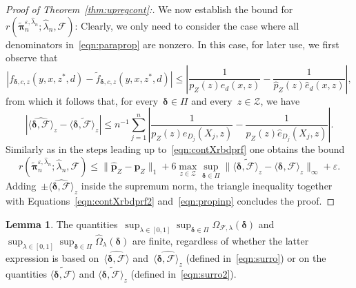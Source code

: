 \documentclass[11pt, a4paper]{article}
\theoremstyle{definition}
\newtheorem{lemma}[theorem]{Lemma}
\begin{document}
\begin{proof}[Proof of Theorem~\ref{thm:upregcont}:]
We now establish the bound for~$r(\tilde{\bm{\pi}}^{\varepsilon,   \hat{\lambda}_n}_n;   \hat{\lambda}_n, \mathcal{F})$: Clearly, we only need to consider the case where all denominators in~\eqref{eqn:paraprop} are nonzero. In this case, for later use, we first observe that
%
\begin{equation}
|f_{\bm{\delta}, c, z}(y, x, z^*, d) - \tilde{f}_{\bm{\delta}, c, z}(y, x, z^*, d)| \leq  \left|  \frac{1}{p_Z(z)e_d(x, z)} - \frac{1}{\hat{p}_Z(z)\hat{e}_d(x, z)} \right|,
\end{equation}
%
from which it follows that, for every~$\bm{\delta} \in \Pi$ and every~$z \in \mathcal{Z}$, we have 
\begin{equation}\label{eqn:propinp}
\left | \widehat{\langle \bm{\delta}, \mathcal{F} \rangle}_z - \widetilde{\langle \bm{\delta}, \mathcal{F} \rangle_z} \right | \leq n^{-1} \sum_{j = 1}^n \left|  \frac{1}{p_Z(z) e_{D_j}(X_j, z)} - \frac{1}{\hat{p}_Z(z)\hat{e}_{D_j}(X_j, z)} \right|.
\end{equation} 
%
Similarly as in the steps leading up to~\eqref{eqn:contXrbdprf} one obtains the bound
$$
r(\tilde{\bm{\pi}}^{\varepsilon,   \hat{\lambda}_n}_n; \hat{\lambda}_n, \mathcal{F}) \leq \|\hat{\bm{p}}_Z - \bm{p}_Z\|_1 + 
6 \max_{z \in \mathcal{Z}} \sup_{\bm{\delta} \in \Pi} \|\widetilde{\langle \bm{\delta}, \mathcal{F} \rangle_z} - \langle \bm{\delta}, \mathcal{F} \rangle_z \|_\infty + \varepsilon.
$$
Adding~$\pm \widehat{\langle \bm{\delta}, \mathcal{F} \rangle}_z$ inside the supremum norm, the triangle inequality together with Equations~\eqref{eqn:contXrbdprf2} and~\eqref{eqn:propinp} concludes the proof. 
\end{proof}


\begin{lemma}\label{lem:bdf}
The quantities~$\sup_{\lambda \in [0, 1]} \sup_{\bm{\delta} \in \Pi} \Omega_{\mathcal{F}, \lambda}(\bm{\delta})$ and $\sup_{\lambda \in [0, 1]} \sup_{\bm{\delta} \in \Pi} \hat{\Omega}_{\lambda}(\bm{\delta})$ are finite, regardless of whether the latter expression is based on~$\widehat{\langle \bm{\delta}, \mathcal{F} \rangle}$ and~$\widehat{\langle \bm{\delta}, \mathcal{F} \rangle_z}$ (defined in~\eqref{eqn:surro}) or on the quantities $\widetilde{\langle \bm{\delta}, \mathcal{F} \rangle}$ and $\widetilde{\langle \bm{\delta}, \mathcal{F} \rangle_z}$ (defined in~\eqref{eqn:surro2}).
\end{lemma}
\end{document}
